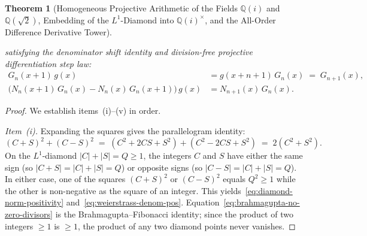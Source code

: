 \documentclass[11pt,a4paper]{article}
\theoremstyle{plain}
\newtheorem{theorem}{Theorem}[section]
\theoremstyle{definition}
\begin{document}
\begin{theorem}[Homogeneous Projective Arithmetic of the Fields $\mathbb{Q}(i)$ and $\mathbb{Q}(\sqrt{2})$, Embedding of the $L^1$-Diamond into $\mathbb{Q}(i)^\times$, and the All-Order Difference Derivative Tower]
\begin{enumerate}[label=\textbf{(\roman*)},leftmargin=*]
  satisfying the denominator shift identity and division-free projective differentiation step law:
  \begin{align}
    G_n(x+1)\,g(x) &= g(x+n+1)\,G_n(x) \;=\; G_{n+1}(x), \label{eq:quotient-denom-shift} \\
    \bigl(N_n(x+1)\,G_n(x) - N_n(x)\,G_n(x+1)\bigr)\,g(x) &= N_{n+1}(x)\,G_n(x). \label{eq:quotient-deriv-step-cancel}
  \end{align}
\end{enumerate}
\end{theorem}

\begin{proof}
We establish items~(i)--(v) in order.

\emph{Item~(i).} Expanding the squares gives the parallelogram identity:
\begin{equation*}
  (C + S)^2 + (C - S)^2 \;=\; (C^2 + 2CS + S^2) + (C^2 - 2CS + S^2) \;=\; 2(C^2 + S^2).
\end{equation*}
On the $L^1$-diamond $|C| + |S| = Q \ge 1$, the integers $C$ and $S$ have either the same sign (so $|C + S| = |C| + |S| = Q$) or opposite signs (so $|C - S| = |C| + |S| = Q$). In either case, one of the squares $(C + S)^2$ or $(C - S)^2$ equals $Q^2 \ge 1$ while the other is non-negative as the square of an integer. This yields~\eqref{eq:diamond-norm-positivity} and~\eqref{eq:weierstrass-denom-pos}. Equation~\eqref{eq:brahmagupta-no-zero-divisors} is the Brahmagupta--Fibonacci identity; since the product of two integers $\ge 1$ is $\ge 1$, the product of any two diamond points never vanishes.


\end{proof}
\end{document}
